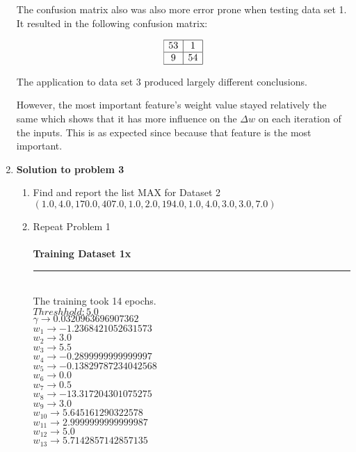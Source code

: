 \begin{enumerate}
		The confusion matrix also was also more error prone when testing data set 1.  It resulted in the following confusion matrix:
		
		\[
			\begin{array}{|c|c|}
				\hline
					53 & 1 \\
					\hline
					9 & 54 \\
				\hline
			\end{array}
		\]
			
		The application to data set 3 produced largely different conclusions.
		
		However, the most important feature's weight value stayed relatively the same which shows that it has more influence on the \(\Delta w\) on each iteration of the inputs.   This is as expected since because that feature is the most important.\\

		
	\item{\bf Solution to problem 3}
		\begin{enumerate}
			\item{Find and report the list MAX for Dataset 2}
				\( (1.0, 4.0, 170.0, 407.0, 1.0, 2.0, 194.0, 1.0, 4.0, 3.0, 3.0, 7.0)\)
			\item{Repeat Problem 1} \\ \\
				\bf{Training Dataset 1x} \\
				\noindent\rule{8cm}{0.4pt} \\
				\textnormal{The training took 14 epochs.} \\
				\(Threshhold: 5.0 \) \\
				\( \gamma \rightarrow 0.0320963696907362 \) \\
				\( w_{1} \rightarrow -1.2368421052631573 \) \\
				\( w_{2} \rightarrow 3.0 \) \\
				\( w_{3} \rightarrow 5.5 \) \\
				\( w_{4} \rightarrow -0.2899999999999997 \) \\
				\( w_{5} \rightarrow -0.13829787234042568 \) \\
				\( w_{6} \rightarrow 0.0 \) \\
				\( w_{7} \rightarrow 0.5 \) \\
				\( w_{8} \rightarrow -13.317204301075275 \) \\
				\( w_{9} \rightarrow 3.0 \) \\
				\( w_{10} \rightarrow 5.645161290322578 \) \\
				\( w_{11} \rightarrow 2.9999999999999987 \) \\
				\( w_{12} \rightarrow 5.0 \) \\
				\( w_{13} \rightarrow 5.7142857142857135 \) \\


\end{enumerate}
\end{enumerate}
